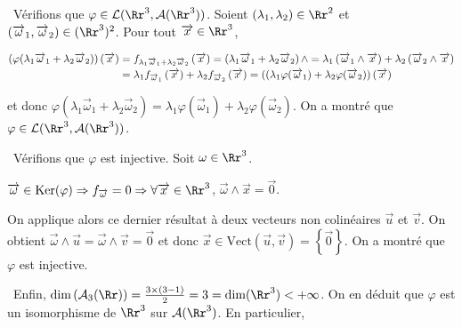 {\begin{enumerate}
{\textbullet~Vérifions que $\varphi\in\mathcal{L}(\Rr^3,\mathcal{A}(\Rr^3))$. Soient $(\lambda_1,\lambda_2)\in\Rr^2$ et $(\overrightarrow{\omega}_1,\overrightarrow{\omega}_2)\in(\Rr^3)^2$. Pour tout $\overrightarrow{x}\in\Rr^3$,

\begin{align*}\ensuremath
\left(\varphi(\lambda_1\overrightarrow{\omega}_1+\lambda_2\overrightarrow{\omega}_2)\right)\left(\overrightarrow{x}\right)&=f_{\lambda_1\overrightarrow{\omega}_1+\lambda_2\overrightarrow{\omega}_2}\left(\overrightarrow{x}\right)=\left(\lambda_1\overrightarrow{\omega}_1+\lambda_2\overrightarrow{\omega}_2\right)\wedge=\lambda_1\left(\overrightarrow{\omega}_1\wedge\overrightarrow{x}\right)+\lambda_2\left(\overrightarrow{\omega}_2\wedge\overrightarrow{x}\right)\\
 &=\lambda_1f_{\overrightarrow{\omega}_1}\left(\overrightarrow{x}\right)+\lambda_2f_{\overrightarrow{\omega}_2}\left(\overrightarrow{x}\right)=\left((\lambda_1\varphi(\overrightarrow{\omega}_1)+\lambda_2\varphi(\overrightarrow{\omega}_2)\right)\left(\overrightarrow{x}\right)
\end{align*}

et donc $\varphi(\lambda_1\overrightarrow{\omega}_1+\lambda_2\overrightarrow{\omega}_2)=\lambda_1\varphi(\overrightarrow{\omega}_1)+\lambda_2\varphi(\overrightarrow{\omega}_2)$. On a montré que $\varphi\in\mathcal{L}(\Rr^3,\mathcal{A}(\Rr^3))$.

\textbullet~Vérifions que $\varphi$ est injective. Soit $\omega\in\Rr^3$.

\begin{center}
$\overrightarrow{\omega}\in\text{Ker}(\varphi)\Rightarrow f_{\overrightarrow{\omega}}=0\Rightarrow\forall\overrightarrow{x}\in\Rr^3$, $\overrightarrow{\omega}\wedge\overrightarrow{x}=\overrightarrow{0}$.
\end{center}

On applique alors ce dernier résultat à deux vecteurs non colinéaires $\overrightarrow{u}$ et $\overrightarrow{v}$. On obtient $\overrightarrow{\omega}\wedge\overrightarrow{u}=\overrightarrow{\omega}\wedge\overrightarrow{v}=\overrightarrow{0}$ et donc $\overrightarrow{x}\in\text{Vect}\left(\overrightarrow{u},\overrightarrow{v}\right)=\left\{\overrightarrow{0}\right\}$. On a montré que $\varphi$ est injective.

\textbullet~Enfin, $\text{dim}\left(\mathcal{A}_3(\Rr)\right)= \frac{3\times(3-1)}{2}=3=\text{dim}(\Rr^3)<+\infty$. On en déduit que $\varphi$ est un isomorphisme de $\Rr^3$ sur $\mathcal{A}(\Rr^3)$. En particulier,

\begin{center}
\end{center}}
\end{enumerate}
}